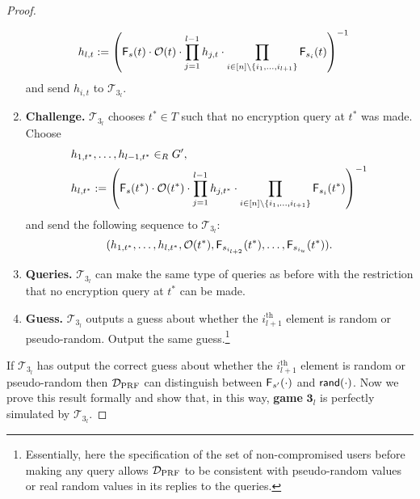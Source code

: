\documentclass[10pt]{extarticle}
\begin{document}
\begin{proof}
\begin{enumerate}
\begin{align*}
 & h_{l,t}:=\left(\text{\upshape\sffamily F}_s(t)\cdot\mathcal{O}(t)\cdot\prod_{j=1}^{l-1}h_{j,t}\cdot\prod_{i\in[n]\setminus\{i_1,\ldots,i_{l+1}\}} \text{\upshape\sffamily F}_{s_i}(t)\right)^{-1}
\end{align*}
and send $h_{i,t}$ to $\mathcal{T}_{3_l}$.
\item\textbf{Challenge.} $\mathcal{T}_{3_l}$ chooses $t^*\in T$ such that no encryption query at $t^*$ was made. Choose 
\begin{align*} & h_{1,t^*},\ldots,h_{l-1,t^*}\in_R G^\prime,\\ 
 & h_{l,t^*}:=\left(\text{\upshape\sffamily F}_s(t^*)\cdot\mathcal{O}(t^*)\cdot\prod_{j=1}^{l-1}h_{j,t^*}
\cdot\prod_{i\in[n]\setminus\{i_1,\ldots,i_{l+1}\}} \text{\upshape\sffamily F}_{s_i}(t^*)\right)^{-1}
\end{align*}
and send the following sequence to $\mathcal{T}_{3_l}$: 
\[(h_{1,t^*},\ldots,h_{l,t^*},\mathcal{O}(t^*),\text{\upshape\sffamily F}_{s_{i_{l+2}}}(t^*),\ldots,\text{\upshape\sffamily F}_{s_{i_u}}(t^*)).\]
\item\textbf{Queries.} $\mathcal{T}_{3_l}$ can make the same type of queries as before with the restriction that no encryption query at $t^*$ can be made.
\item\textbf{Guess.} $\mathcal{T}_{3_l}$ outputs a guess about whether the $i_{l+1}^{\text{th}}$ element is random or pseudo-random. Output the same guess.\footnote{Essentially, here the specification of the set of non-compromised users before making any query allows $\mathcal{D}_{\mbox{\scriptsize PRF}}$ to be consistent with pseudo-random values or real random values in its replies to the queries.} 
\end{enumerate}
If $\mathcal{T}_{3_l}$ has output the correct guess about whether the $i_{l+1}^{\text{th}}$ element is random or pseudo-random then $\mathcal{D}_{\mbox{\scriptsize PRF}}$ can distinguish between $\text{\upshape\sffamily F}_{s^\prime}(\cdot)$ and $\mbox{\upshape\sffamily rand}(\cdot)$. Now we prove this result formally and show that, in this way, \textbf{game} $\boldsymbol 3_l$ is perfectly simulated by $\mathcal{T}_{3_l}$.\par\medskip


\end{proof}
\end{document}
